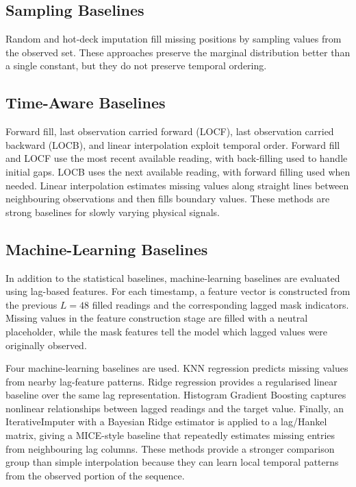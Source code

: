 \subsection{Sampling Baselines}
Random and hot-deck imputation fill missing positions by sampling values from the observed set. These approaches preserve the marginal distribution better than a single constant, but they do not preserve temporal ordering.

\subsection{Time-Aware Baselines}
Forward fill, last observation carried forward (LOCF), last observation carried backward (LOCB), and linear interpolation exploit temporal order. Forward fill and LOCF use the most recent available reading, with back-filling used to handle initial gaps. LOCB uses the next available reading, with forward filling used when needed. Linear interpolation estimates missing values along straight lines between neighbouring observations and then fills boundary values. These methods are strong baselines for slowly varying physical signals.

\subsection{Machine-Learning Baselines}
In addition to the statistical baselines, machine-learning baselines are evaluated using lag-based features. For each timestamp, a feature vector is constructed from the previous $L=48$ filled readings and the corresponding lagged mask indicators. Missing values in the feature construction stage are filled with a neutral placeholder, while the mask features tell the model which lagged values were originally observed.

Four machine-learning baselines are used. KNN regression predicts missing values from nearby lag-feature patterns. Ridge regression provides a regularised linear baseline over the same lag representation. Histogram Gradient Boosting captures nonlinear relationships between lagged readings and the target value. Finally, an IterativeImputer with a Bayesian Ridge estimator is applied to a lag/Hankel matrix, giving a MICE-style baseline that repeatedly estimates missing entries from neighbouring lag columns. These methods provide a stronger comparison group than simple interpolation because they can learn local temporal patterns from the observed portion of the sequence.

